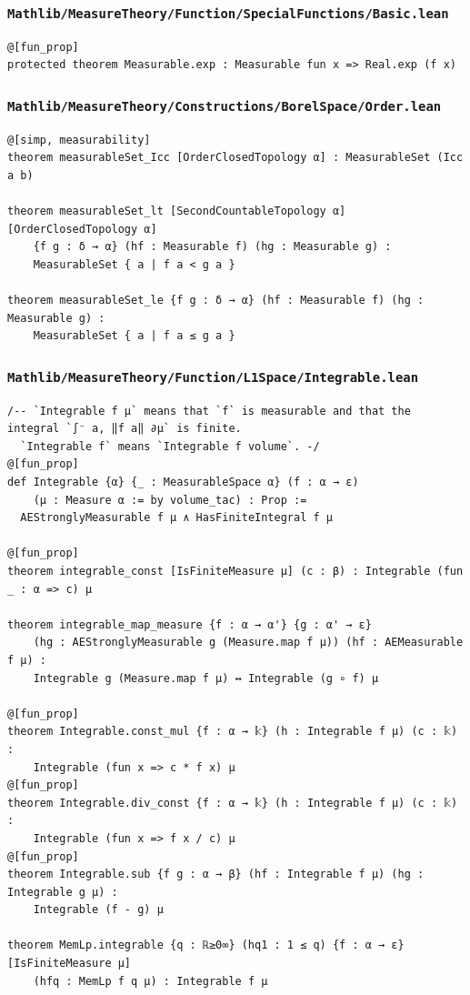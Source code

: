 \newpage
\subsubsection{\texttt{Mathlib/MeasureTheory/Function/SpecialFunctions/Basic.lean}}
\begin{lstlisting}[language=lean]
@[fun_prop]
protected theorem Measurable.exp : Measurable fun x => Real.exp (f x)
\end{lstlisting}

\subsubsection{\texttt{Mathlib/MeasureTheory/Constructions/BorelSpace/Order.lean}}
\begin{lstlisting}[language=lean]
@[simp, measurability]
theorem measurableSet_Icc [OrderClosedTopology α] : MeasurableSet (Icc a b)

theorem measurableSet_lt [SecondCountableTopology α] [OrderClosedTopology α]
    {f g : δ → α} (hf : Measurable f) (hg : Measurable g) :
    MeasurableSet { a | f a < g a }

theorem measurableSet_le {f g : δ → α} (hf : Measurable f) (hg : Measurable g) :
    MeasurableSet { a | f a ≤ g a }
\end{lstlisting}

\subsubsection{\texttt{Mathlib/MeasureTheory/Function/L1Space/Integrable.lean}}
\begin{lstlisting}[language=lean]
/-- `Integrable f μ` means that `f` is measurable and that the integral `∫⁻ a, ‖f a‖ ∂μ` is finite.
  `Integrable f` means `Integrable f volume`. -/
@[fun_prop]
def Integrable {α} {_ : MeasurableSpace α} (f : α → ε)
    (μ : Measure α := by volume_tac) : Prop :=
  AEStronglyMeasurable f μ ∧ HasFiniteIntegral f μ

@[fun_prop]
theorem integrable_const [IsFiniteMeasure μ] (c : β) : Integrable (fun _ : α => c) μ

theorem integrable_map_measure {f : α → α'} {g : α' → ε}
    (hg : AEStronglyMeasurable g (Measure.map f μ)) (hf : AEMeasurable f μ) :
    Integrable g (Measure.map f μ) ↔ Integrable (g ∘ f) μ

@[fun_prop]
theorem Integrable.const_mul {f : α → 𝕜} (h : Integrable f μ) (c : 𝕜) :
    Integrable (fun x => c * f x) μ
@[fun_prop]
theorem Integrable.div_const {f : α → 𝕜} (h : Integrable f μ) (c : 𝕜) :
    Integrable (fun x => f x / c) μ
@[fun_prop]
theorem Integrable.sub {f g : α → β} (hf : Integrable f μ) (hg : Integrable g μ) :
    Integrable (f - g) μ

theorem MemLp.integrable {q : ℝ≥0∞} (hq1 : 1 ≤ q) {f : α → ε} [IsFiniteMeasure μ]
    (hfq : MemLp f q μ) : Integrable f μ
\end{lstlisting}


